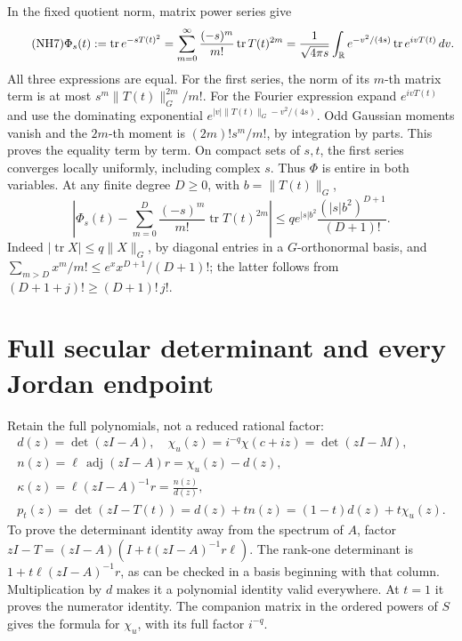 \documentclass[11pt]{article}
\newcommand{\tr}{\operatorname{tr}}\newcommand{\dd}{\dagger_G}
\begin{document}
In the fixed quotient norm, matrix power series give
\begin{equation}\tag{NH7}\label{NH7}
\Phi_s(t):=\tr e^{-sT(t)^2}
=\sum_{m=0}^\infty\frac{(-s)^m}{m!}\tr T(t)^{2m}
=\frac1{\sqrt{4\pi s}}\int_\R
e^{-v^2/(4s)}\tr e^{ivT(t)}\,dv .
\end{equation}
All three expressions are equal. For the first series,
the norm of its \(m\)-th matrix term is at most
 \(s^m\|T(t)\|_G^{2m}/m!\).
For the Fourier expression expand \(e^{ivT(t)}\) and
use the dominating exponential
\(e^{|v|\|T(t)\|_G-v^2/(4s)}\).
Odd Gaussian moments vanish and the \(2m\)-th moment is
\((2m)!s^m/m!\), by integration by parts. This proves
the equality term by term. On compact sets of \(s,t\),
the first series converges locally uniformly, including
complex \(s\). Thus \(\Phi\) is entire in both variables.
At any finite degree \(D\ge0\), with \(b=\|T(t)\|_G\),
\begin{equation}\tag{NH8}\label{NH8}
\left|\Phi_s(t)-\sum_{m=0}^D
\frac{(-s)^m}{m!}\tr T(t)^{2m}\right|
\le q e^{|s|b^2}\frac{(|s|b^2)^{D+1}}{(D+1)!}.
\end{equation}
Indeed \(|\tr X|\le q\|X\|_G\), by diagonal entries in
a \(G\)-orthonormal basis, and
\(\sum_{m>D}x^m/m!\le e^x x^{D+1}/(D+1)!\);
the latter follows from
\((D+1+j)!\ge(D+1)!\,j!\).

\section{Full secular determinant and every Jordan endpoint}

Retain the full polynomials, not a reduced rational factor:
\begin{equation}\tag{NH9}\label{NH9}
\begin{gathered}
d(z)=\det(zI-A),\quad
\chi_u(z)=i^{-q}\chi(c+iz)=\det(zI-M),\\
n(z)=\ell\,\operatorname{adj}(zI-A)r=\chi_u(z)-d(z),\\
\kappa(z)=\ell(zI-A)^{-1}r=\frac{n(z)}{d(z)},\\
p_t(z)=\det(zI-T(t))=d(z)+tn(z)=(1-t)d(z)+t\chi_u(z).
\end{gathered}
\end{equation}
To prove the determinant identity away from the spectrum
of \(A\), factor \(zI-T=(zI-A)(I+t(zI-A)^{-1}r\ell)\).
The rank-one determinant is \(1+t\ell(zI-A)^{-1}r\),
as can be checked in a basis beginning with that column.
Multiplication by \(d\) makes it a polynomial identity
valid everywhere. At \(t=1\) it proves the numerator
identity. The companion matrix in the ordered powers of
\(S\) gives the formula for \(\chi_u\), with its full
factor \(i^{-q}\).
\end{document}
